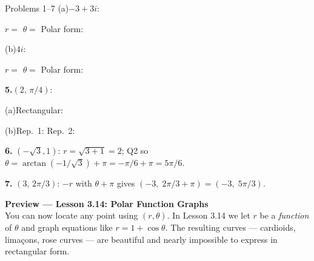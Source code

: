 \documentclass[10pt]{article}
\begin{document}
\begin{notesbox}{Problems 1--7}
\vspace{4pt}
(a)\quad $-3+3i$:

\vspace{4pt}
$r = $  \qquad
$\theta = $  \qquad
Polar form: 

\vspace{8pt}
(b)\quad $4i$:

\vspace{4pt}
$r = $  \qquad
$\theta = $  \qquad
Polar form: 

\vspace{0.14in}
\textbf{5.}\quad $(2,\, \pi/4)$:

\vspace{4pt}
(a)\quad Rectangular: 

\vspace{6pt}
(b)\quad Rep.\ 1:  \qquad
Rep.\ 2: 

\vspace{0.14in}
\textbf{6.}\quad {} \quad
$(-\sqrt{3},1)$: $r = \sqrt{3+1} = 2$; Q2 so $\theta = \arctan(-1/\sqrt{3})+\pi = -\pi/6+\pi = 5\pi/6$.

\vspace{0.12in}
\textbf{7.}\quad {} \quad
$(3,\, 2\pi/3)$: $-r$ with $\theta+\pi$ gives $(-3,\; 2\pi/3+\pi) = (-3,\; 5\pi/3)$.

\end{notesbox}

\vspace{0.08in}

\begin{tcolorbox}[colback=navylight, colframe=navy, arc=2mm,
    left=3mm, right=3mm, top=2mm, bottom=2mm]
\small\textbf{Preview --- Lesson 3.14: Polar Function Graphs}\\
You can now locate any point using $(r,\theta)$. In Lesson 3.14 we let $r$
be a \emph{function} of $\theta$ and graph equations like $r = 1+\cos\theta$.
The resulting curves --- cardioids, limaçons, rose curves --- are beautiful
and nearly impossible to express in rectangular form.
\end{tcolorbox}
\end{document}
